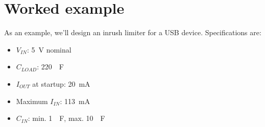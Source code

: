 \documentclass[letterpaper,12pt]{article}
\begin{document}
\section{Worked example}
\label{sec:example}

As an example, we'll design an inrush limiter for a USB device. Specifications are:

\begin{itemize}
\item{$V_{IN}$: \SI{5}{V} nominal}
\item{$C_{LOAD}$: \SI{220}{\mu F}}
\item{$I_{OUT}$ at startup: \SI{20}{mA}}
\item{Maximum $I_{IN}$: \SI{113}{mA} \cite{usb2}}
\item{$C_{IN}$: min. \SI{1}{\mu F}, max. \SI{10}{\mu F} \cite{usb2}}
\end{itemize}

\hrulefill
\end{document}
